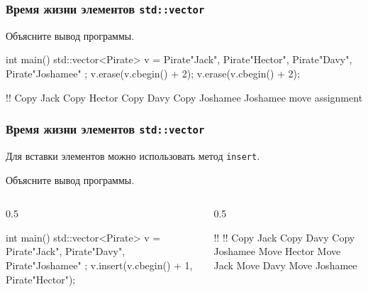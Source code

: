 \documentclass[compress, 8pt, aspectratio=169]{beamer}
\begin{document}
  \begin{frame}[fragile]

    \frametitle{Время жизни элементов \texttt{std::vector}}

    \begin{task}
      Объясните вывод программы.
    \end{task}

    \begin{mycppinplacelisting}
int main() {
    std::vector<Pirate> v = {
        Pirate{"Jack"}, Pirate{"Hector"},
        Pirate{"Davy"}, Pirate{"Joshamee"}
    };
    v.erase(v.cbegin() + 2);
    v.erase(v.cbegin() + 2);
}
    \end{mycppinplacelisting}

    \begin{terminalwindow}
!!
Copy Jack
Copy Hector
Copy Davy
Copy Joshamee
Joshamee move assignment
    \end{terminalwindow}

  \end{frame}

  \begin{frame}[fragile]

    \frametitle{Время жизни элементов \texttt{std::vector}}

    Для вставки элементов можно использовать метод \texttt{insert}.

    \begin{task}
      Объясните вывод программы.
    \end{task}

    \begin{columns}[T]

      \begin{column}{0.5\textwidth}

        \begin{mycppinplacelisting}
int main() {
    std::vector<Pirate> v = {
        Pirate{"Jack"},
        Pirate{"Davy"},
        Pirate{"Joshamee"}
    };
    v.insert(v.cbegin() + 1,
        Pirate{"Hector"});
}
        \end{mycppinplacelisting}

      \end{column}

      \begin{column}{0.5\textwidth}

        \begin{terminalwindow}
!!
!!
Copy Jack
Copy Davy
Copy Joshamee
Move Hector
Move Jack
Move Davy
Move Joshamee
        \end{terminalwindow}

      \end{column}

    \end{columns}

  \end{frame}
\end{document}
